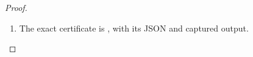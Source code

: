 \begin{proof}
\begin{enumerate}[label=\arabic*.]
\item The exact certificate is , with its JSON and captured output.

\end{enumerate}
\end{proof}